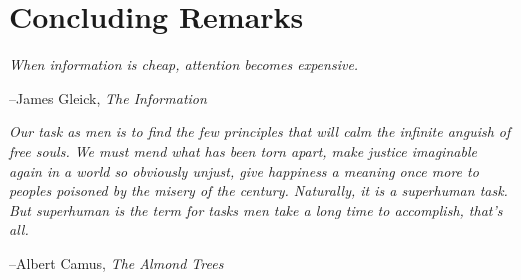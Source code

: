 \chapter{Concluding Remarks}
\label{chap:conclusion}

\epigraph{
\textit{When information is cheap, attention becomes expensive.}
}
{
--James Gleick, \textit{The Information}
}

\epigraph{
\textit{Our task as men is to find the few principles that will calm the infinite anguish
of free souls. We must mend what has been torn apart, make justice imaginable again in a
world so obviously unjust, give happiness a meaning once more to peoples poisoned by the
misery of the century. Naturally, it is a superhuman task. But superhuman is the term
for tasks men take a long time to accomplish, that's all.}
}
{
--Albert Camus, \textit{The Almond Trees}
}
